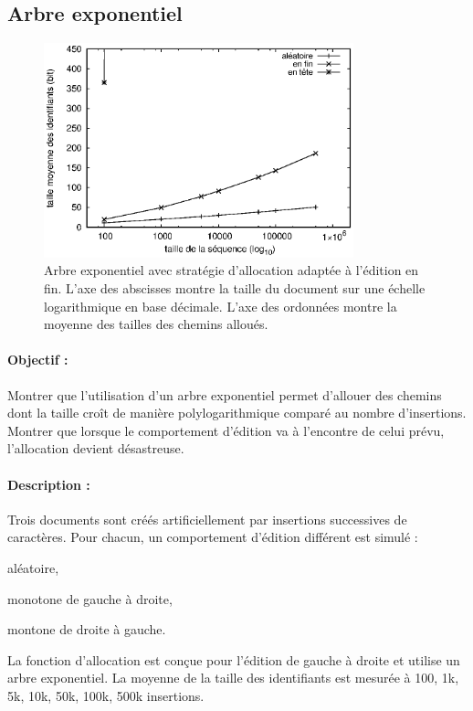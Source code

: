 \subsection{Arbre exponentiel}

\begin{figure}
  \begin{center}
    \includegraphics[width=0.8\textwidth]{img/lseq/double.eps}
    \caption{\label{repl:img:exponentialtree} Arbre exponentiel avec stratégie
      d'allocation adaptée à l'édition en fin. L'axe des abscisses montre la
      taille du document sur une échelle logarithmique en base décimale. L'axe
      des ordonnées montre la moyenne des tailles des chemins alloués.}
  \end{center}
\end{figure}

\paragraph{Objectif :} Montrer que l'utilisation d'un arbre exponentiel permet
d'allouer des chemins dont la taille croît de manière polylogarithmique comparé
au nombre d'insertions. Montrer que lorsque le comportement d'édition va à
l'encontre de celui prévu, l'allocation devient désastreuse.

\paragraph{Description :} Trois documents sont créés artificiellement par
insertions successives de caractères. Pour chacun, un comportement d'édition
différent est simulé :
\begin{inparaenum}[(i)]
\item aléatoire,
\item monotone de gauche à droite,
\item montone de droite à gauche.
\end{inparaenum}
La fonction d'allocation est conçue pour l'édition de gauche à droite et utilise
un arbre exponentiel.  La moyenne de la taille des identifiants est mesurée à
100, 1k, 5k, 10k, 50k, 100k, 500k insertions. 

